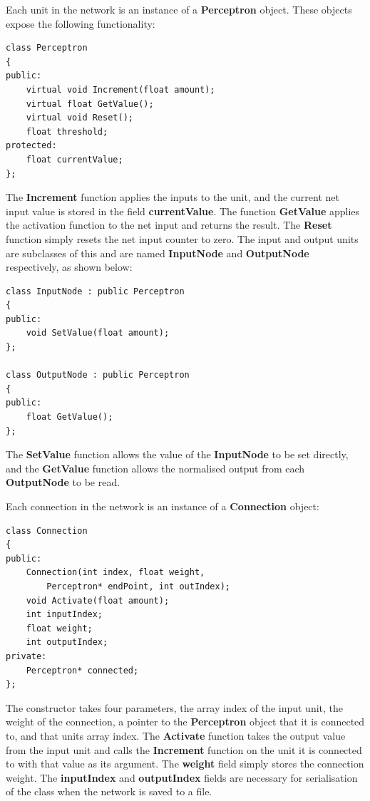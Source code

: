 \documentclass{acm_proc_article-sp}
\begin{document}
\vspace{3mm}

Each unit in the network is an instance of a \textbf{Perceptron} object. These objects expose the following functionality:

\begin{verbatim}
class Perceptron
{
public:
    virtual void Increment(float amount);
    virtual float GetValue();
    virtual void Reset();
    float threshold;
protected:
    float currentValue;	
};
\end{verbatim}

The \textbf{Increment} function applies the inputs to the unit, and the current net input value is stored in the field \textbf{currentValue}. The function \textbf{GetValue} applies the activation function to the net input and returns the result. The \textbf{Reset} function simply resets the net input counter to zero. The input and output units are subclasses of this and are named \textbf{InputNode} and \textbf{OutputNode} respectively, as shown below:

\begin{verbatim}
class InputNode : public Perceptron
{
public:
    void SetValue(float amount);
};

class OutputNode : public Perceptron
{
public:
    float GetValue();
};
\end{verbatim}

The \textbf{SetValue} function allows the value of the \textbf{InputNode} to be set directly, and the \textbf{GetValue} function allows the normalised output from each \textbf{OutputNode} to be read.

\vspace{3mm}

Each connection in the network is an instance of a \textbf{Connection} object:

\begin{verbatim}
class Connection
{
public:
    Connection(int index, float weight, 
        Perceptron* endPoint, int outIndex);
    void Activate(float amount);
    int inputIndex;
    float weight;
    int outputIndex;
private:
    Perceptron* connected;
};
\end{verbatim}

The constructor takes four parameters, the array index of the input unit, the weight of the connection, a pointer to the \textbf{Perceptron} object that it is connected to, and that units array index. The \textbf{Activate} function takes the output value from the input unit and calls the \textbf{Increment} function on the unit it is connected to with that value as its argument. The \textbf{weight} field simply stores the connection weight. The \textbf{inputIndex} and \textbf{outputIndex} fields are necessary for serialisation of the class when the network is saved to a file.
\end{document}
